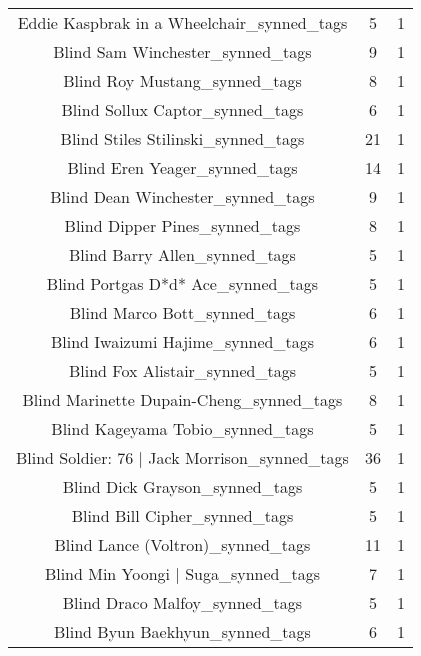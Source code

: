 \begin{table}[h!]
{\begin{tabular}{|c|c|c|}
        Eddie Kaspbrak in a Wheelchair\_synned\_tags &           5 &          1 \\
                  Blind Sam Winchester\_synned\_tags &           9 &          1 \\
                     Blind Roy Mustang\_synned\_tags &           8 &          1 \\
                   Blind Sollux Captor\_synned\_tags &           6 &          1 \\
                Blind Stiles Stilinski\_synned\_tags &          21 &          1 \\
                     Blind Eren Yeager\_synned\_tags &          14 &          1 \\
                 Blind Dean Winchester\_synned\_tags &           9 &          1 \\
                    Blind Dipper Pines\_synned\_tags &           8 &          1 \\
                     Blind Barry Allen\_synned\_tags &           5 &          1 \\
                Blind Portgas D*d* Ace\_synned\_tags &           5 &          1 \\
                      Blind Marco Bott\_synned\_tags &           6 &          1 \\
                 Blind Iwaizumi Hajime\_synned\_tags &           6 &          1 \\
                    Blind Fox Alistair\_synned\_tags &           5 &          1 \\
          Blind Marinette Dupain-Cheng\_synned\_tags &           8 &          1 \\
                  Blind Kageyama Tobio\_synned\_tags &           5 &          1 \\
     Blind Soldier: 76 | Jack Morrison\_synned\_tags &          36 &          1 \\
                    Blind Dick Grayson\_synned\_tags &           5 &          1 \\
                     Blind Bill Cipher\_synned\_tags &           5 &          1 \\
                 Blind Lance (Voltron)\_synned\_tags &          11 &          1 \\
               Blind Min Yoongi | Suga\_synned\_tags &           7 &          1 \\
                    Blind Draco Malfoy\_synned\_tags &           5 &          1 \\
                   Blind Byun Baekhyun\_synned\_tags &           6 &          1 \\

\end{tabular}}
\end{table}
